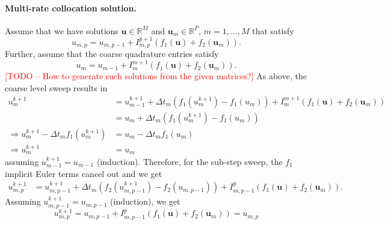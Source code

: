\documentclass{article}
\newcommand{\ve}[1]{\mathbf{#1}}
\newcommand{\todo}[1]{\textcolor{red}{[TODO -- #1]}}
\begin{document}
\paragraph{Multi-rate collocation solution.}
Assume that we have solutions $\ve{u} \in \mathbb{R}^{M}$ and $\ve{u}_m \in \mathbb{R}^{P}$, $m=1, \ldots, M$ that satisfy
\begin{equation}
	u_{m,p} = u_{m,p-1} + I_{m,p}^{p+1} \left( f_1(\ve{u}) + f_2(\ve{u}_m) \right).
\end{equation}
Further, assume that the coarse quadrature entries satisfy
\begin{equation}
	u_{m} = u_{m-1} + I_{m}^{m+1} \left( f_1(\ve{u}) + f_2(\ve{u}_m) \right).
\end{equation}
\todo{How to generate such solutions from the given matrices?}
As above, the coarse level sweep results in
\begin{align*}
	u_{m}^{k+1} &= u^{k+1}_{m-1} + \Delta t_m \left( f_1(u^{k+1}_m) - f_1(u_m) \right) + I_m^{m+1}\left( f_1(\ve{u}) + f_2(\ve{u}_m) \right) \\
				&= u_{m} + \Delta t_m \left( f_1(u^{k+1}_m) - f_1(u_m) \right) \\
\Rightarrow u^{k+1}_m - \Delta t_m f_1(u^{k+1}_{m}) &= u_m - \Delta t_m f_1(u_m) \\
\Rightarrow u^{k+1}_m &= u_m
\end{align*}
assuming $u^{k+1}_{m-1} = u_{m-1}$ (induction).
Therefore, for the sub-step sweep, the $f_1$ implicit Euler terms cancel out and we get
\begin{align*}
	u_{m,p}^{k+1} &= u_{m,p-1}^{k+1} + \Delta t_m \left( f_2(u_{m,p-1}^{k+1}) - f_2(u_{m,p-1}) \right) + I_{m,p-1}^{p} \left( f_1(\ve{u}) + f_2(\ve{u}_m) \right).
\end{align*}
Assuming $u^{k+1}_{m,p-1} = u_{m,p-1}$ (induction), we get
\begin{equation}
	u_{m,p}^{k+1} = u_{m,p-1} + I_{m,p-1}^{p} \left( f_1(\ve{u}) + f_2(\ve{u}_m) \right) = u_{m,p}
\end{equation}

\end{document}
